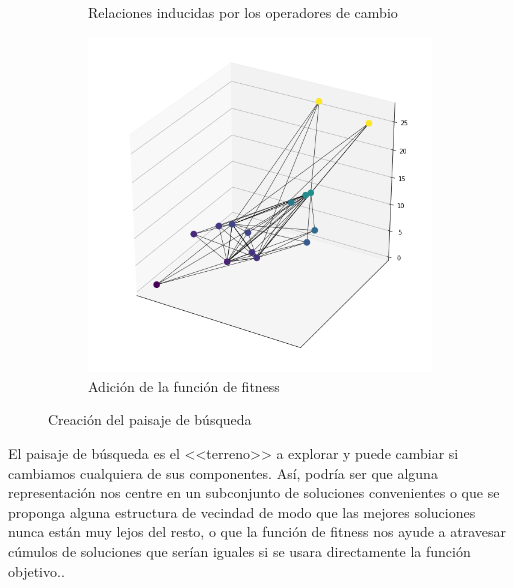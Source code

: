 \begin{figure}
\begin{subfigure}{.5\textwidth}
    \caption{Relaciones inducidas por los operadores de cambio}
\end{subfigure}
\begin{subfigure}{\textwidth}
    \centering
    \includegraphics[scale=.5]{Imagenes/search3.png}
    \caption{Adición de la función de fitness}    
\end{subfigure}
\caption{Creación del paisaje de búsqueda}
\label{fig:landscape}
\end{figure}

\medskip
El paisaje de búsqueda es el <<terreno>> a explorar y puede cambiar si cambiamos cualquiera de sus componentes.
%
Así, podría ser que alguna representación nos centre en un subconjunto de soluciones convenientes o que se proponga alguna estructura de vecindad 
de modo que las mejores soluciones nunca están muy lejos del resto, o que la función de fitness nos ayude a atravesar cúmulos de soluciones que serían iguales si se usara
directamente la función objetivo..

